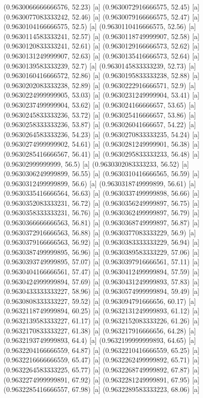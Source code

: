 {{{(0.9630066666666576, 52.23) [a] 
(0.9630072916666575, 52.45) [a] 
(0.9630077083333242, 52.46) [a] 
(0.9630079166666575, 52.47) [a] 
(0.9630104166666575, 52.5) [a] 
(0.9630110416666575, 52.56) [a] 
(0.9630114583333241, 52.57) [a] 
(0.9630118749999907, 52.58) [a] 
(0.9630120833333241, 52.61) [a] 
(0.9630129166666573, 52.62) [a] 
(0.9630131249999907, 52.63) [a] 
(0.9630135416666573, 52.64) [a] 
(0.9630139583333239, 52.7) [a] 
(0.9630145833333239, 52.73) [a] 
(0.9630160416666572, 52.86) [a] 
(0.9630195833333238, 52.88) [a] 
(0.9630202083333238, 52.89) [a] 
(0.9630222916666571, 52.9) [a] 
(0.9630224999999905, 53.03) [a] 
(0.9630231249999904, 53.41) [a] 
(0.9630237499999904, 53.62) [a] 
(0.963024166666657, 53.65) [a] 
(0.9630245833333236, 53.72) [a] 
(0.963025416666657, 53.86) [a] 
(0.9630258333333236, 53.87) [a] 
(0.963026041666657, 54.22) [a] 
(0.9630264583333236, 54.23) [a] 
(0.9630270833333235, 54.24) [a] 
(0.9630274999999902, 54.61) [a] 
(0.9630281249999901, 56.38) [a] 
(0.9630285416666567, 56.41) [a] 
(0.9630295833333233, 56.48) [a] 
(0.96302999999999, 56.5) [a] 
(0.9630302083333233, 56.52) [a] 
(0.9630306249999899, 56.55) [a] 
(0.9630310416666565, 56.59) [a] 
(0.9630312499999899, 56.6) [a] 
(0.9630318749999899, 56.61) [a] 
(0.9630335416666564, 56.63) [a] 
(0.9630337499999898, 56.66) [a] 
(0.9630352083333231, 56.72) [a] 
(0.9630356249999897, 56.75) [a] 
(0.9630358333333231, 56.76) [a] 
(0.9630362499999897, 56.79) [a] 
(0.9630366666666563, 56.81) [a] 
(0.9630368749999897, 56.87) [a] 
(0.9630372916666563, 56.88) [a] 
(0.9630377083333229, 56.9) [a] 
(0.9630379166666563, 56.92) [a] 
(0.9630383333333229, 56.94) [a] 
(0.9630387499999895, 56.96) [a] 
(0.9630389583333229, 57.06) [a] 
(0.9630393749999895, 57.07) [a] 
(0.9630397916666561, 57.11) [a] 
(0.9630404166666561, 57.47) [a] 
(0.9630412499999894, 57.59) [a] 
(0.9630424999999894, 57.69) [a] 
(0.9630431249999893, 57.83) [a] 
(0.9630433333333227, 58.96) [a] 
(0.9630574999999894, 59.49) [a] 
(0.9630808333333227, 59.52) [a] 
(0.963094791666656, 60.17) [a] 
(0.9632118749999894, 60.25) [a] 
(0.9632131249999893, 61.12) [a] 
(0.9632139583333227, 61.17) [a] 
(0.9632152083333226, 61.26) [a] 
(0.9632170833333227, 61.38) [a] 
(0.963217916666656, 64.28) [a] 
(0.9632193749999893, 64.4) [a] 
(0.9632199999999893, 64.65) [a] 
(0.9632204166666559, 64.87) [a] 
(0.9632210416666559, 65.25) [a] 
(0.9632216666666559, 65.47) [a] 
(0.9632262499999892, 65.71) [a] 
(0.9632264583333225, 65.77) [a] 
(0.9632268749999892, 67.87) [a] 
(0.9632274999999891, 67.92) [a] 
(0.9632281249999891, 67.95) [a] 
(0.9632285416666557, 67.98) [a] 
(0.9632289583333223, 68.06) [a] 
}}}
